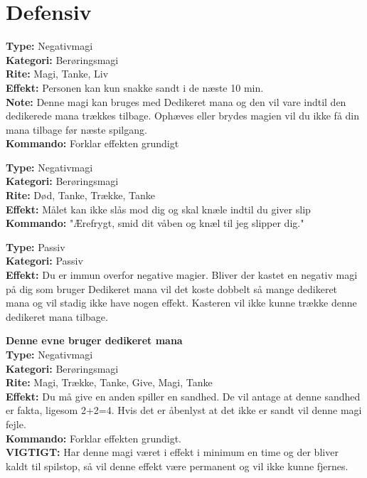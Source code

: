 \section{Defensiv}

\begin{defensiv*}[Sandhed]
\textbf{Type:} Negativmagi\\
\textbf{Kategori:} Berøringsmagi\\
\textbf{Rite:} Magi, Tanke, Liv\\
\textbf{Effekt:} Personen kan kun snakke sandt i de næste 10 min.\\
\textbf{Note:} Denne magi kan bruges med Dedikeret mana og den vil vare indtil den dedikerede mana trækkes tilbage. Ophæves eller brydes magien vil du ikke få din mana tilbage før næste spilgang.\\
\textbf{Kommando:} Forklar effekten grundigt\\
\end{defensiv*}

\begin{defensiv*}[Ærefrygt]
\textbf{Type:} Negativmagi\\
\textbf{Kategori:} Berøringsmagi\\
\textbf{Rite:} Død, Tanke, Trække, Tanke\\
\textbf{Effekt:} Målet kan ikke slås mod dig og skal knæle indtil du giver slip\\
\textbf{Kommando:} "Ærefrygt, smid dit våben og knæl til jeg slipper dig."\\
\end{defensiv*}

\begin{defensiv*}
\textbf{Type:} Passiv\\
\textbf{Kategori:} Passiv\\
\textbf{Effekt:} Du er immun overfor negative magier. Bliver der kastet en negativ magi på dig som bruger Dedikeret mana vil det koste dobbelt så mange dedikeret mana og vil stadig ikke have nogen effekt. Kasteren vil ikke kunne trække denne dedikeret mana tilbage.
\end{defensiv*}

\begin{defensiv*}
\textbf{Denne evne bruger dedikeret mana}\\
\textbf{Type:} Negativmagi\\
\textbf{Kategori:} Berøringsmagi\\
\textbf{Rite:} Magi, Trække, Tanke, Give, Magi, Tanke\\
\textbf{Effekt:} Du må give en anden spiller en sandhed. De vil antage at denne sandhed er fakta, ligesom 2+2=4. Hvis det er åbenlyst at det ikke er sandt vil denne magi fejle.\\
\textbf{Kommando:} Forklar effekten grundigt.\\
\textbf{VIGTIGT:} Har denne magi været i effekt i minimum en time og der bliver kaldt til spilstop, så vil denne effekt være permanent og vil ikke kunne fjernes.
\end{defensiv*}

